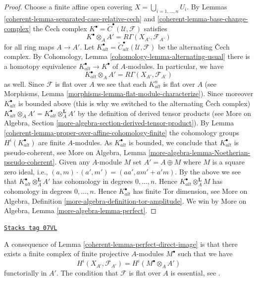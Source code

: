 \begin{proof}

Choose a finite affine open covering $X = \bigcup_{i = 1, \ldots, n} U_i$.
By Lemmas \ref{coherent-lemma-separated-case-relative-cech} and
\ref{coherent-lemma-base-change-complex} the {\v C}ech complex
$K^\bullet = {\check C}^\bullet(\mathcal{U}, \mathcal{F})$ satisfies
$$
K^\bullet \otimes_A A' = R\Gamma(X_{A'}, \mathcal{F}_{A'})
$$
for all ring maps $A \to A'$. Let
$K_{alt}^\bullet = {\check C}_{alt}^\bullet(\mathcal{U}, \mathcal{F})$
be the alternating {\v C}ech complex. By
Cohomology, Lemma \ref{cohomology-lemma-alternating-usual}
there is a homotopy equivalence $K_{alt}^\bullet \to K^\bullet$
of $A$-modules. In particular, we have
$$
K_{alt}^\bullet \otimes_A A' = R\Gamma(X_{A'}, \mathcal{F}_{A'})
$$
as well. Since $\mathcal{F}$ is flat over $A$ we see that each $K_{alt}^n$
is flat over $A$ (see
Morphisms, Lemma \ref{morphisms-lemma-flat-module-characterize}).
Since moreover $K_{alt}^\bullet$ is bounded above (this is why we switched
to the alternating {\v C}ech complex)
$K_{alt}^\bullet \otimes_A A' = K_{alt}^\bullet \otimes_A^{\mathbf{L}} A'$
by the definition of derived tensor products (see
More on Algebra, Section \ref{more-algebra-section-derived-tensor-product}).
By
Lemma \ref{coherent-lemma-proper-over-affine-cohomology-finite}
the cohomology groups $H^i(K_{alt}^\bullet)$ are finite $A$-modules.
As $K_{alt}^\bullet$ is bounded, we conclude that $K_{alt}^\bullet$
is pseudo-coherent, see
More on Algebra, Lemma \ref{more-algebra-lemma-Noetherian-pseudo-coherent}.
Given any $A$-module $M$ set $A' = A \oplus M$ where $M$ is a square zero
ideal, i.e., $(a, m) \cdot (a', m') = (aa', am' + a'm)$. By the
above we see that $K_{alt}^\bullet \otimes_A^\mathbf{L} A'$ has cohomology
in degrees $0, \ldots, n$. Hence $K_{alt}^\bullet \otimes_A^\mathbf{L} M$
has cohomology in degrees $0, \ldots, n$. Hence $K_{alt}^\bullet$ has
finite Tor dimension, see
More on Algebra, Definition \ref{more-algebra-definition-tor-amplitude}.
We win by More on Algebra, Lemma \ref{more-algebra-lemma-perfect}.
\end{proof}

\begin{remark}
\label{coherent-remark-explain-perfect-direct-image}
\href{https://stacks.math.columbia.edu/tag/07VL}{\texttt{Stacks tag 07VL}}

A consequence of Lemma \ref{coherent-lemma-perfect-direct-image} is that there
exists a finite complex of finite projective $A$-modules $M^\bullet$ such
that we have
$$
H^i(X_{A'}, \mathcal{F}_{A'}) = H^i(M^\bullet \otimes_A A')
$$
functorially in $A'$. The condition that $\mathcal{F}$ is
flat over $A$ is essential, see \cite{Hartshorne}.
\end{remark}


